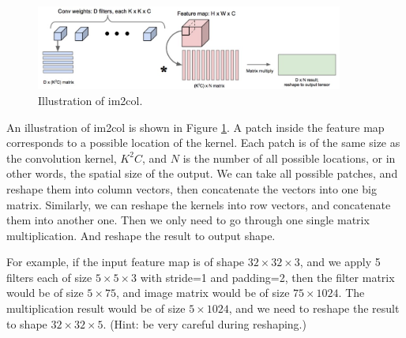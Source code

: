 \begin{figure}[H]
    \centering
    \includegraphics[width=0.9\textwidth]{images/im2col.jpg}
    \caption{Illustration of im2col.}
    \label{fig:im2col}
\end{figure}

An illustration of im2col is shown in Figure \ref{fig:im2col}. A patch inside the feature map corresponds to a possible location of the kernel. Each patch is of the same size as the convolution kernel, $K^2 C$, and $N$ is the number of all possible locations, or in other words, the spatial size of the output. We can take all possible patches, and reshape them into column vectors, then concatenate the vectors into one big matrix. Similarly, we can reshape the kernels into row vectors, and concatenate them into another one. Then we only need to go through one single matrix multiplication. And reshape the result to output shape.

For example, if the input feature map is of shape $32\times 32\times 3$, and we apply 5 filters each of size $5\times 5\times 3$ with stride=1 and padding=2, then the filter matrix would be of size $5\times 75$, and image matrix would be of size $75\times 1024$. The multiplication result would be of size $5\times1024$, and we need to reshape the result to shape $32\times 32\times 5$. (Hint: be very careful during reshaping.) 

\pagebreak

